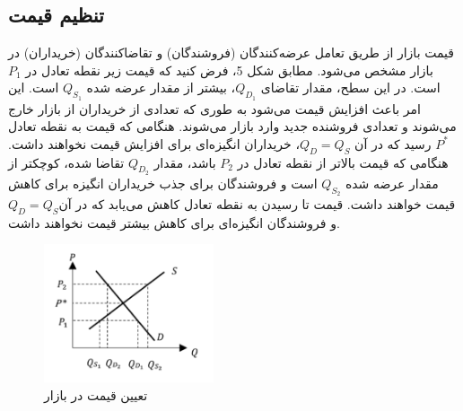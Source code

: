 \subsection{تنظیم قیمت}\label{sec:market_price}

قیمت بازار از طریق تعامل عرضه‌کنندگان (فروشندگان) و تقاضاکنندگان (خریداران) در بازار مشخص می‌شود.
مطابق شکل 5، فرض کنید که قیمت زیر نقطه تعادل در $P_1$ است. در این سطح، مقدار تقاضای $Q_{D_1}$، بیشتر از مقدار عرضه شده $Q_{S_1}$ است. این امر باعث افزایش قیمت می‌شود به طوری که تعدادی از خریداران از بازار خارج می‌شوند و تعدادی فروشنده جدید وارد بازار می‌شوند. هنگامی که قیمت به نقطه تعادل $P^*$ رسید که در آن $Q_D = Q_S$، خریداران انگیزه‌ای برای افزایش قیمت نخواهند داشت. هنگامی که قیمت بالاتر از نقطه تعادل در $P_2$ باشد، مقدار $Q_{D_2}$ تقاضا شده، کوچکتر از مقدار عرضه شده $Q_{S_2}$ است و فروشندگان برای جذب خریداران انگیزه برای کاهش قیمت خواهند داشت. قیمت تا رسیدن به نقطه تعادل کاهش می‌یابد که در آن$Q_D = Q_S$ و فروشندگان انگیزه‌ای برای کاهش بیشتر قیمت نخواهند داشت.

 \begin{figure}[H]
	\includegraphics[width=5cm]{../Figure/introduction/market_price.png}
	\centering
	\caption{تعیین قیمت در بازار}
	\label{fig:market_price}
\end{figure}


